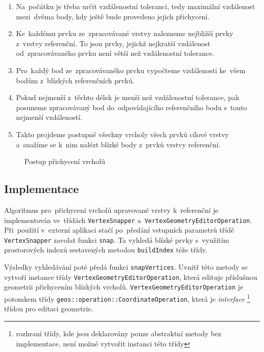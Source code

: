 \begin{enumerate}
 \item Na~počátku je třeba určit vzdálenostní toleranci, tedy maximální 
    vzdálenost mezi~dvěma body, kdy ještě bude provedeno jejich přichycení.
 \item Ke~každému prvku ze~zpracovávané vrstvy nalezneme nejbližší prvky 
    z~vrstvy referenční. To jsou prvky, jejichž nejkratší vzdálenost 
    od~zpracovávaného prvku není větší	než vzdálenostní tolerance.
 \item Pro~každý bod ze~zpracovávaného prvku vypočteme vzdálenosti ke~všem
    bodům z~blízkých referenčních prvků.
 \item Pokud nejmenší z~těchto délek je menší než vzdálenostní tolerance, 
    pak posuneme zpracovávaný bod do~odpovídajícího referenčního bodu s~touto
    nejmenší vzdáleností.
 \item Takto projdeme postupně všechny vrcholy všech prvků cílové vrstvy 
    a~snažíme se k~nim nalézt blízké body z~prvků vrstvy referenční. 
\end{enumerate}

\label{vspic}
  \begin{figure}[hbt]
    \centering
      
      \caption{Postup přichycení vrcholů}
      \label{fig:vs-princip}
  \end{figure}

\subsection{Implementace} %
\label{vs-implementace}
Algoritmus pro~přichycení vrcholů upravované vrstvy k~referenční je 
implementován ve~třídách \texttt{Vertex\-Snapper} 
a~\texttt{Vertex\-Geometry\-Editor\-Operation}. Při~použití v~externí aplikaci 
stačí po~předání vstupních parametrů třídě \texttt{Vertex\-Snapper} zavolat 
funkci \texttt{snap}. Ta vyhledá blízké prvky s~využitím prostorových 
indexů sestavených metodou \texttt{build\-Index} téže třídy.

Výsledky vyhledávání poté předá funkci \texttt{snap\-Vertices}. Uvnitř této
metody se vytvoří instance  třídy \texttt{Vertex\-Geometry\-Editor\-Operation},
která edituje příslušnou geometrii přichycením blízkých vrcholů.
\texttt{Vertex\-Geometry\-Editor\-Operation} je potomkem třídy 
\texttt{geos::\-operation::\-Coordinate\-Operation}, která je \textit{inter\-face}
\footnote{rozhraní třídy, kde jsou deklarovány pouze abstraktní metody bez
implementace, není možné vytvořit instanci této třídy} třídou pro editaci 
geometrie.


